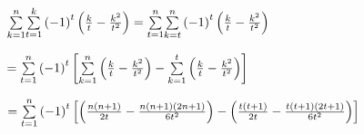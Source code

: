 \documentclass{ctexart}
\begin{document}
$\overset{n}{\underset{k=1}{\sum }}\overset{k}{\underset{t=1}{\sum }}\left(
-1\right) ^{t}\left( \frac{k}{t}-\frac{k^{2}}{t^{2}}\right) =\overset{n}{%
\underset{t=1}{\sum }}\overset{n}{\underset{k=t}{\sum }}\left( -1\right)
^{t}\left( \frac{k}{t}-\frac{k^{2}}{t^{2}}\right) $

$=\overset{n}{\underset{t=1}{\sum }}\left( -1\right) ^{t}\left[ \overset{n}{%
\underset{k=1}{\sum }}\left( \frac{k}{t}-\frac{k^{2}}{t^{2}}\right) -%
\underset{k=1}{\overset{t}{\sum }}\left( \frac{k}{t}-\frac{k^{2}}{t^{2}}%
\right) \right] $

$=\overset{n}{\underset{t=1}{\sum }}\left( -1\right) ^{t}\left[ \left( \frac{%
n\left( n+1\right) }{2t}-\frac{n\left( n+1\right) \left( 2n+1\right) }{6t^{2}%
}\right) -\left( \frac{t\left( t+1\right) }{2t}-\frac{t\left( t+1\right)
\left( 2t+1\right) }{6t^{2}}\right) \right] $
\end{document}
